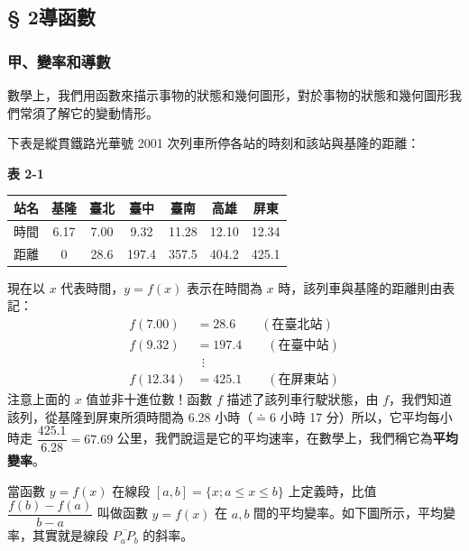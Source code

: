 \subsection*{§ 2\quad 導函數}\label{subsec:b6s-app4-2}
\setcounter{theorem}{0}
\renewcommand{\thetheorem}{2.\arabic{theorem}}

\subsubsection*{甲、變率和導數}

數學上，我們用函數來描示事物的狀態和幾何圖形，對於事物的狀態和幾何圖形我們常須了解它的變動情形。

下表是縱貫鐵路光華號 2001 次列車所停各站的時刻和該站與基隆的距離：

\begin{center}
\textbf{表 2-1}

\renewcommand{\arraystretch}{1.2}
\begin{tabular}{|c|c|c|c|c|c|c|}
\hline
站名 & 基隆 & 臺北 & 臺中 & 臺南 & 高雄 & 屏東 \\ \hline
時間 & 6.17 & 7.00 & 9.32 & 11.28 & 12.10 & 12.34 \\ \hline
距離 & 0 & 28.6 & 197.4 & 357.5 & 404.2 & 425.1 \\ \hline
\end{tabular}
\end{center}

現在以 $x$ 代表時間，$y=f(x)$ 表示在時間為 $x$ 時，該列車與基隆的距離則由表記：
\begin{align*}
f(7.00) &= 28.6 \qquad (\text{在臺北站}) \\
f(9.32) &= 197.4 \qquad (\text{在臺中站}) \\
&\ \ \vdots \\
f(12.34) &= 425.1 \qquad (\text{在屏東站})
\end{align*}
注意上面的 $x$ 值並非十進位數！函數 $f$ 描述了該列車行駛狀態，由 $f$，我們知道該列，從基隆到屏東所須時間為 6.28 小時（$\doteq 6$ 小時 17 分）所以，它平均每小時走 $\dfrac{425.1}{6.28} = 67.69$ 公里，我們說這是它的平均速率，在數學上，我們稱它為\textbf{平均變率}。

當函數 $y=f(x)$ 在線段 $[a, b] = \{x; a\le x\le b\}$ 上定義時，比值 $\dfrac{f(b)-f(a)}{b-a}$ 叫做函數 $y=f(x)$ 在 $a, b$ 間的平均變率。如下圖所示，平均變率，其實就是線段 $\overline{P_a P_b}$ 的斜率。


